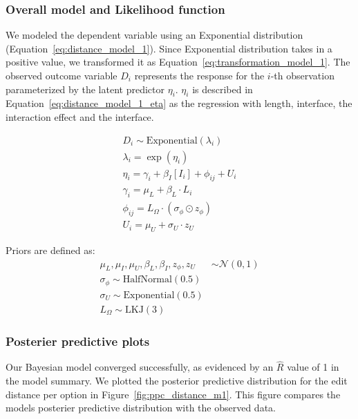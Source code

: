 \subsubsection{Overall model and Likelihood function}
We modeled the dependent variable using an Exponential distribution (Equation~\ref{eq:distance_model_1}). Since Exponential distribution takes in a positive value, we transformed it as Equation~\ref{eq:transformation_model_1}. The observed outcome variable $D_i$ represents the response for the $i$-th observation parameterized by the latent predictor $\eta_i$. $\eta_i$ is described in Equation~\ref{eq:distance_model_1_eta} as the regression with length, interface, the interaction effect and the interface.

\begin{align}
    D_i \sim \text{Exponential}(\lambda_i) \label{eq:distance_model_1} \\
    \lambda_i = \exp(\eta_i) \label{eq:transformation_model_1}\\
    \eta_i = \gamma_i + \beta_I[I_i] + \phi_{ij} + U_i \label{eq:distance_model_1_eta} \\
    \gamma_i = \mu_L + \beta_L \cdot L_i \label{eq:distance_model_1_eta_ordinal} \\
    \phi_{ij} = L_{\Omega} \cdot (\sigma_{\phi} \odot z_{\phi}) \label{eq:distance_model_1_lkj} \\
    U_i = \mu_U + \sigma_U \cdot z_U \label{eq:distance_model_1_user_effect}
\end{align}

Priors are defined as:
\begin{align}
    \mu_L, \mu_I, \mu_U, \beta_L, \beta_I, z_{\phi}, z_U &\sim \mathcal{N}(0, 1) \label{eq:priors_global_mean} \\
    \sigma_{\phi} \sim \text{HalfNormal}(0.5) \label{eq:priors_sigma_phi} \\
    \sigma_U \sim \text{Exponential}(0.5) \label{eq:priors_sigma_U} \\
    L_{\Omega} \sim \text{LKJ}(3) \label{eq:priors_L_Omega}
\end{align}

\subsubsection{Posterier predictive plots}
Our Bayesian model converged successfully, as evidenced by an $\hat{R}$ value of 1 in the model summary. We plotted the posterior predictive distribution for the edit distance per option in Figure~\ref{fig:ppc_distance_m1}. This figure compares the models posterier predictive distribution with the observed data. 

